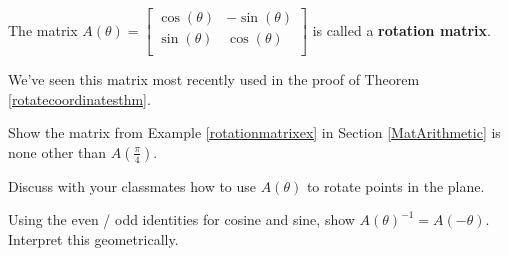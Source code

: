 \documentclass{ximera}
\begin{document}
\begin{question}
\begin{problem}
\begin{solution}


\end{solution}
\end{problem}

\end{question}

\begin{question}
 The matrix $A(\theta) = \left[ \begin{array}{rr} \cos(\theta) & -\sin(\theta) \\ \sin(\theta) & \cos(\theta) \\ \end{array} \right]$  is called a \textbf{rotation matrix}. 
 
 \smallskip
 
 We've seen this matrix most recently  used in the proof of Theorem \ref{rotatecoordinatesthm}.

\begin{problem}
  Show the matrix from Example \ref{rotationmatrixex} in Section \ref{MatArithmetic} is none other than $A\left(\frac{\pi}{4}\right)$.
\end{problem}

\begin{problem}
Discuss with your classmates how to use $A(\theta)$ to rotate points in the plane.
\end{problem}

\begin{problem}
Using the even / odd identities for cosine and sine,  show $A(\theta)^{-1} = A(-\theta)$.  Interpret this geometrically.
\end{problem}

\end{question}
\end{document}
